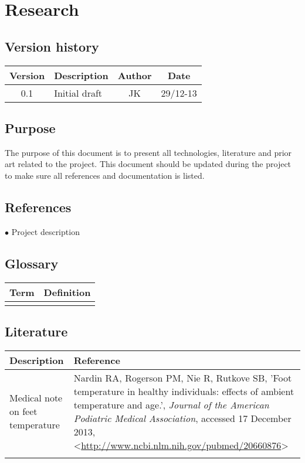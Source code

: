 \chapter{Research}
\section{Version history}
\begin{table}[H]
\begin{tabular}{|c|p{9cm}|c|c|}
\hline
Version & Description & Author & Date\\
\hline
0.1 & Initial draft & JK & 29/12-13\\
\hline
\end{tabular}
\end{table}

\section{Purpose}
The purpose of this document is to present all technologies, literature and prior art related to the project. This document should be updated during the project to make sure all references and documentation is listed.

\section{References}
$\bullet$ Project description

\section{Glossary}
\begin{table}[H]
\centering
\begin{tabular}{|p{4cm}|p{7cm}|}
\hline
Term & Definition\\ \hline
&\\ \hline
\end{tabular}
\end{table}

\section{Literature}


\begin{table}[H]
\centering
\begin{tabular}{|p{4cm}|p{10cm}|}
\hline
Description & Reference\\ \hline
Medical note on feet temperature&Nardin RA, Rogerson PM, Nie R, Rutkove SB, 'Foot temperature in healthy individuals: effects of ambient temperature and age.', \textit{Journal of the American Podiatric Medical Association}, accessed 17 December 2013, <\url{http://www.ncbi.nlm.nih.gov/pubmed/20660876}>\\ \hline
& \\ \hline
\end{tabular}
\end{table}


